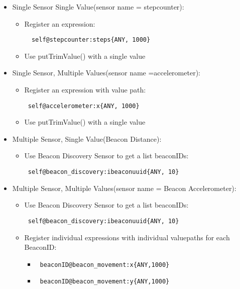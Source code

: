 \begin{itemize}
  \item Single Sensor Single Value(sensor name = stepcounter):
  \begin{itemize}
    \item Register an expression: \begin{verbatim}  self@stepcounter:steps{ANY, 1000}\end{verbatim} 
    \item Use putTrimValue() with a single value
  \end{itemize}
 
  \item  Single Sensor, Multiple Values(sensor name =accelerometer):
  \begin{itemize}
    \item Register an expression with value path: \begin{verbatim} self@accelerometer:x{ANY, 1000}\end{verbatim}
    \item Use putTrimValue() with a single value
  \end{itemize}

  \item Multiple Sensor, Single Value(Beacon Distance):
  \begin{itemize}
    \item Use Beacon Discovery Sensor to get a list beaconIDs: \begin{verbatim} self@beacon_discovery:ibeaconuuid{ANY, 10}\end{verbatim} 
  \end{itemize}

  \item  Multiple Sensor, Multiple Values(sensor name = Beacon Accelerometer):
  \begin{itemize}
    \item Use Beacon Discovery Sensor to get a list beaconIDs: \begin{verbatim} self@beacon_discovery:ibeaconuuid{ANY, 10}\end{verbatim}
    \item Register individual expressions with individual valuepaths for each BeaconID: 
    \begin{itemize}
     \item \begin{verbatim} beaconID@beacon_movement:x{ANY,1000} \end{verbatim}
     \item \begin{verbatim} beaconID@beacon_movement:y{ANY,1000} \end{verbatim}
    \end{itemize}

 \end{itemize}


\end{itemize}

